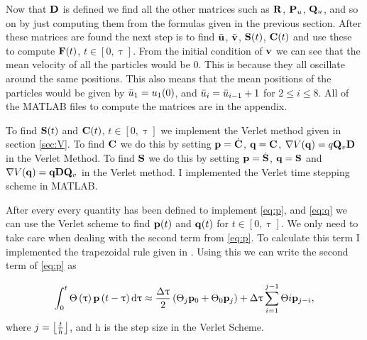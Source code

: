 Now that $\mathbf{D}$ is defined we find all the other matrices such as $\mathbf{R}$, $\mathbf{P}_u$, $\mathbf{Q}_u$, and so on by just computing them from the formulas given in the previous section. After these matrices are found the next step is to find $\bar{\mathbf{u}}$, $\bar{\mathbf{v}}$, $\mathbf{S}(t)$, $\mathbf{C}(t)$ and use these to compute $\mathbf{F}(t)$, $t\in\left[0, \uptau \right]$. From the initial condition of $\mathbf{v}$ we can see that the mean velocity of all the particles would be 0. This is  because they all oscillate around the same positions. This also means that the mean positions of the particles would be given by $\bar{u}_1 = u_1(0)$, and $\bar{u}_i=\bar{u}_{i-1}+1$ for $2\leq i\leq 8$. All of the MATLAB files to compute the matrices are in the appendix. 

To find $\mathbf{S}(t)$ and $\mathbf{C}(t)$, $t\in \left[0,\uptau\right]$ we implement the Verlet method given in section \ref{sec:V}. To find $\mathbf{C}$ we do this by setting $\mathbf{p} = \dot{\mathbf{C}}$, $\mathbf{q} = \mathbf{C}$, $\nabla V(\mathbf{q})=q\mathbf{Q}_v \mathbf{D}$ in the Verlet Method. To find $\mathbf{S}$ we do this by setting $\mathbf{p}=\dot{\mathbf{S}}$, $\mathbf{q}=\mathbf{S}$ and $\nabla V(\mathbf{q})=\mathbf{q}\mathbf{D}\mathbf{Q}_v$ in the Verlet method. I implemented the Verlet time stepping scheme in MATLAB.

After every every quantity has been defined to implement \eqref{eq:p}, and \eqref{eq:q} we can use the Verlet scheme to find $\mathbf{p}(t)$ and $\mathbf{q}(t)$ for $t\in\left[0,\uptau \right]$. We only need to take care when dealing with the second term from \eqref{eq:p}. To calculate this term I implemented the trapezoidal rule given in \cite{Scherer2015}. Using this we can write the second term of \eqref{eq:p} as

\begin{align*}
\int_{0}^{t} \Theta\left(\uptau\right)\mathbf{p}\left(t-\uptau\right) \mathop{}\!\mathrm{d} \uptau \approx \frac{\Delta \uptau}{2}\left(\Theta_j\mathbf{p}_{0}+\Theta_0\mathbf{p}_{j}\right) + \Delta\uptau\sum_{i=1}^{j-1} \Theta{i}\mathbf{p}_{j-i}, 
\end{align*}
where $j=\left \lfloor \frac{t}{h} \right \rfloor$, and h is the step size in the Verlet Scheme.
